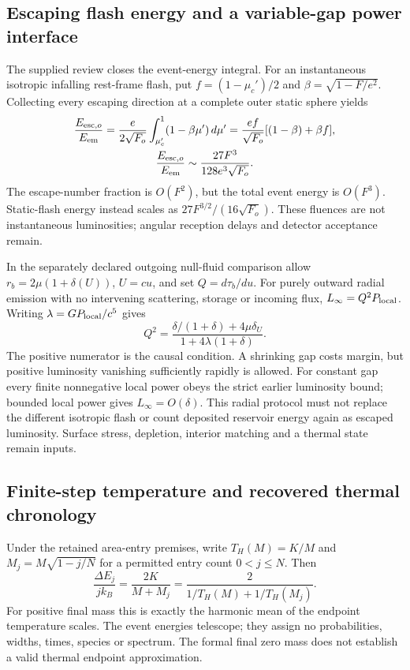 \documentclass[10pt,twocolumn,letterpaper]{article}
\begin{document}
\subsection{Escaping flash energy and a variable-gap power interface}
The supplied review closes the event-energy integral. For an instantaneous
isotropic infalling rest-frame flash, put $f=(1-\mu_c')/2$ and
$\beta=\sqrt{1-F/e^2}$. Collecting every escaping direction at a complete
outer static sphere yields
\begin{equation}
\begin{gathered}
 \frac{E_{{\rm esc},o}}{E_{\rm em}}
 =\frac{e}{2\sqrt{F_o}}\int_{\mu_c'}^1(1-\beta\mu')\,d\mu'
 =\frac{ef}{\sqrt{F_o}}[(1-\beta)+\beta f],\\
 \frac{E_{{\rm esc},o}}{E_{\rm em}}
       \sim\frac{27F^3}{128e^3\sqrt{F_o}}.
\end{gathered}
\end{equation}
The escape-number fraction is $O(F^2)$, but the total event energy is
$O(F^3)$. Static-flash energy instead scales as
$27F^{3/2}/(16\sqrt{F_o})$. These fluences are not instantaneous
luminosities; angular reception delays and detector acceptance remain.

In the separately declared outgoing null-fluid comparison allow
$r_b=2\mu(1+\delta(U))$, $U=cu$, and set $Q=d\tau_b/du$.
For purely outward radial emission with no intervening scattering,
storage or incoming flux, $L_\infty=Q^2P_{\rm local}$.
Writing $\lambda=GP_{\rm local}/c^5$ gives
\begin{equation}
 Q^2=\frac{\delta/(1+\delta)+4\mu\delta_U}
           {1+4\lambda(1+\delta)}.
 \label{eq:li-variable-gap-power}
\end{equation}
The positive numerator is the causal condition. A shrinking gap costs
margin, but positive luminosity vanishing sufficiently rapidly is allowed.
For constant gap every finite nonnegative local power obeys the strict
earlier luminosity bound; bounded local power gives $L_\infty=O(\delta)$.
This radial protocol must not replace the different isotropic flash or
count deposited reservoir energy again as escaped luminosity. Surface
stress, depletion, interior matching and a thermal state remain inputs.

\subsection{Finite-step temperature and recovered thermal chronology}
Under the retained area-entry premises, write $T_H(M)=K/M$ and
$M_j=M\sqrt{1-j/N}$ for a permitted entry count $0<j\leq N$.
Then
\begin{equation}
 \frac{\Delta E_j}{jk_B}=\frac{2K}{M+M_j}
 =\frac{2}{1/T_H(M)+1/T_H(M_j)}.
\end{equation}
For positive final mass this is exactly the harmonic mean of the endpoint
temperature scales. The event energies telescope; they assign no
probabilities, widths, times, species or spectrum. The formal final zero
mass does not establish a valid thermal endpoint approximation.
\end{document}
